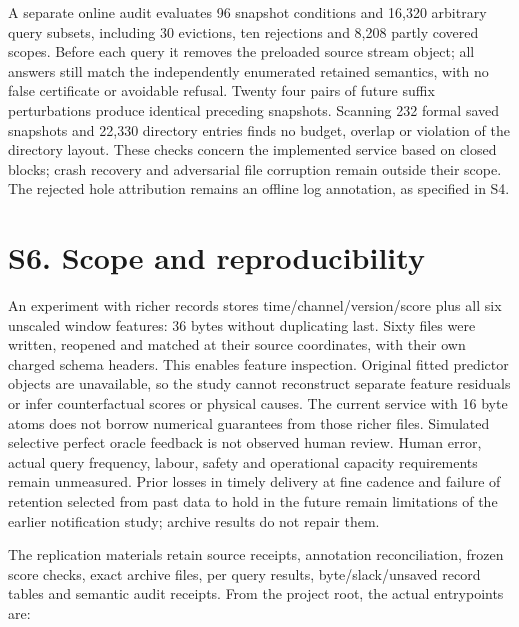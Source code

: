 \documentclass[11pt]{article}
\begin{document}
A separate online audit evaluates 96 snapshot conditions and 16,320 arbitrary query subsets, including 30 evictions, ten rejections and 8,208 partly covered scopes. Before each query it removes the preloaded source stream object; all answers still match the independently enumerated retained semantics, with no false certificate or avoidable refusal. Twenty four pairs of future suffix perturbations produce identical preceding snapshots. Scanning 232 formal saved snapshots and 22,330 directory entries finds no budget, overlap or violation of the directory layout. These checks concern the implemented service based on closed blocks; crash recovery and adversarial file corruption remain outside their scope. The rejected hole attribution remains an offline log annotation, as specified in S4.

\section*{S6. Scope and reproducibility}
An experiment with richer records stores time/channel/version/score plus all six unscaled window features: 36 bytes without duplicating last. Sixty files were written, reopened and matched at their source coordinates, with their own charged schema headers. This enables feature inspection. Original fitted predictor objects are unavailable, so the study cannot reconstruct separate feature residuals or infer counterfactual scores or physical causes. The current service with 16 byte atoms does not borrow numerical guarantees from those richer files. Simulated selective perfect oracle feedback is not observed human review. Human error, actual query frequency, labour, safety and operational capacity requirements remain unmeasured. Prior losses in timely delivery at fine cadence and failure of retention selected from past data to hold in the future remain limitations of the earlier notification study; archive results do not repair them.

The replication materials retain source receipts, annotation reconciliation, frozen score checks, exact archive files, per query results, byte/slack/unsaved record tables and semantic audit receipts. From the project root, the actual entrypoints are:
\end{document}
